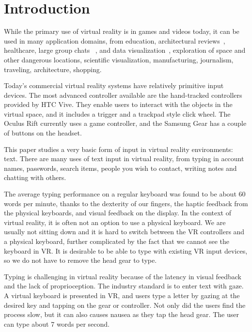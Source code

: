 \section{Introduction}

While the primary use of virtual reality is in games and videos today, it can be used in many application domains, from education, architectural reviews~\cite{guerreiro2014beyond}, healthcare, large group chats ~\cite{mcnerney1999system}, and data visualization~\cite{abbott2011empire}, exploration of space and other dangerous locations, scientific visualization, manufacturing, journalism, traveling, architecture, shopping.

Today's commercial virtual reality systems have relatively primitive input devices.
The most advanced controller available are the hand-tracked controllers provided by HTC Vive.
They enable users to interact with the objects in the virtual space, and it includes a trigger and a trackpad style click wheel.
The Oculus Rift currently uses a game controller, and the Samsung Gear has a couple of buttons on the headset.

This paper studies a very basic form of input in virtual reality environments: text.  There are many uses of text input in virtual reality, from typing in account names, passwords, search items, people you wish to contact, writing notes and chatting with others.    

The average typing performance on a regular keyboard was found to be about 60 words per minute\cite{Varcholik}, thanks to the dexterity of our fingers, the haptic feedback from the physical keyboards, and visual feedback on the display.    In the context of virtual reality, it is often not an option to use a physical keyboard.  We are usually not sitting down and it is hard to switch between the VR controllers and a physical keyboard, further complicated by the fact that we cannot see the keyboard in VR. It is desirable to be able to type with existing VR input devices, so we do not have to remove the head gear to type. 

Typing is challenging in virtual reality because of the latency in visual feedback and the lack of proprioception.  The industry standard is to enter text with gaze.  A virtual keyboard is presented in VR, and users type a letter by gazing at the desired key and tapping on the gear or controller.  Not only did the users find the process slow, but it can also causes nausea as they tap the head gear.  The user can type about 7 words per second.   

